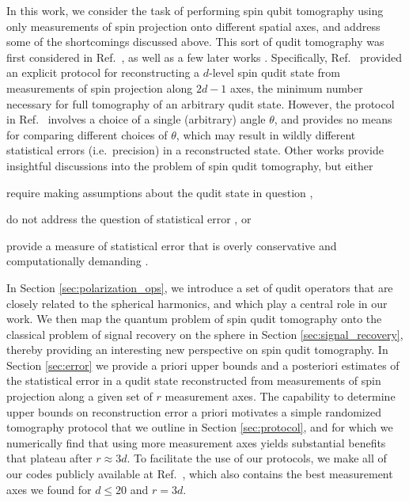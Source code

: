 \documentclass[nofootinbib,twocolumn]{revtex4-1}
\begin{document}
In this work, we consider the task of performing spin qubit tomography using only measurements of spin projection onto different spatial axes, and address some of the shortcomings discussed above.
This sort of qudit tomography was first considered in Ref.~\cite{newton1968measurability}, as well as a few later works \cite{hofmann2004quantumstate, filippov2010inverse, schmied2011tomographic}.
Specifically, Ref.~\cite{newton1968measurability} provided an explicit protocol for reconstructing a $d$-level spin qudit state from measurements of spin projection along $2d-1$ axes, the minimum number necessary for full tomography of an arbitrary qudit state.
However, the protocol in Ref.~\cite{newton1968measurability} involves a choice of a single (arbitrary) angle $\theta$, and provides no means for comparing different choices of $\theta$, which may result in wildly different statistical errors (i.e.~precision) in a reconstructed state.
Other works provide insightful discussions into the problem of spin qudit tomography, but either
\begin{enumerate*}
\item require making assumptions about the qudit state in question \cite{schmied2011tomographic},
\item do not address the question of statistical error \cite{hofmann2004quantumstate}, or
\item provide a measure of statistical error that is overly conservative and computationally demanding \cite{filippov2010inverse}.
\end{enumerate*}

In Section \ref{sec:polarization_ops}, we introduce a set of qudit operators that are closely related to the spherical harmonics, and which play a central role in our work.
We then map the quantum problem of spin qudit tomography onto the classical problem of signal recovery on the sphere in Section \ref{sec:signal_recovery}, thereby providing an interesting new perspective on spin qudit tomography.
In Section \ref{sec:error} we provide a priori upper bounds and a posteriori estimates of the statistical error in a qudit state reconstructed from measurements of spin projection along a given set of $r$ measurement axes.
The capability to determine upper bounds on reconstruction error a priori motivates a simple randomized tomography protocol that we outline in Section \ref{sec:protocol}, and for which we numerically find that using more measurement axes yields substantial benefits that plateau after $r\approx3d$.
To facilitate the use of our protocols, we make all of our codes publicly available at Ref.~\cite{tomo_codes}, which also contains the best measurement axes we found for $d\le20$ and $r=3d$.
\end{document}

